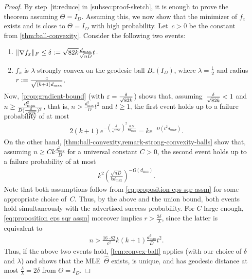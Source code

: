 \documentclass[aos]{imsart}
\theoremstyle{definition}
\numberwithin{equation}{section}
\DeclarePairedDelimiter{\norm}{\lVert}{\rVert}
\newcommand{\htheta}{\widehat{\Theta}}
\newcommand{\eps}{\varepsilon}
\newcommand{\rv}{x}
\def\dmin{d_{\min}}
\def\dmax{d_{\max}}
\begin{document}
\begin{proof}
By step~\ref{it:reduce} in \cref{subsec:proof-sketch}, it is enough to prove the theorem assuming $\Theta = I_D$.
Assuming this, we now show that the minimizer of $f_\rv$ exists and is close to $\Theta = I_D$ with high probability.
Let~$c>0$ be the constant from \cref{thm:ball-convexity}.
Consider the following two events:
\begin{enumerate}
\item\label{it:grad-bd} $\norm{\nabla f_x}_F \leq \delta := \sqrt{82 k} \frac{\dmax }{\sqrt{nD}} t$.
\item\label{it:sc-ball} $f_\rv$ is $\lambda$-strongly convex on the geodesic ball $B_r(I_D)$, where $\lambda=\frac12$ and radius $r := \smash{\frac c{\sqrt{(k+1) \dmax}}}$.
\end{enumerate}
Now, \cref{prop:gradient-bound} (with $\eps=\smash{\frac\delta{\sqrt{82 k}}}$) shows that, assuming~$\smash{\frac\delta{\sqrt{82 k}}} < 1$ and $n \geq \smash{\frac{\dmax^2}{D (\frac\delta{\sqrt{82 k}})^2}}$, that is,
$n > \frac{\dmax^2}D t^2$ and $t \geq 1$, the first event holds up to a failure probability of at most
\begin{align*}
  2(k+1)e^{-(\frac\delta{\sqrt{82 k}})^2 \frac{nD}{8\dmax}}
= k e^{-\Omega(t^2 \dmax)}.
\end{align*}
On the other hand, \cref{thm:ball-convexity,remark-strong-convexity-balls} show that, assuming $n \geq C k \frac{\dmax^2}D$ for a universal constant $C>0$, the second event holds up to a failure probability of at most
\begin{align*}
  k^2 \left( \frac{\sqrt{nD}}{k \dmax} \right)^{-\Omega(\dmin)}.
\end{align*}
Note that both assumptions follow from \cref{eq:proposition eps sqr assm} for some appropriate choice of~$C$.
Thus, by the above and the union bound, both events hold simultaneously with the advertised success probability.
For $C$ large enough, \cref{eq:proposition eps sqr assm} moreover implies
$r > \frac{2\delta}\lambda$, since the latter is equivalent to
\begin{align*}
  n > \frac{16 \cdot 82}{c^2} k (k+1) \frac{\dmax^3}{D} t^2.
\end{align*}
Thus, if the above two events hold, \cref{lem:convex-ball} applies (with our choice of $\delta$ and $\lambda$) and shows that the MLE~$\htheta$ exists, is unique, and has geodesic distance at most $\frac\delta\lambda = 2 \delta$ from $\Theta = I_D$.
\end{proof}
\end{document}
